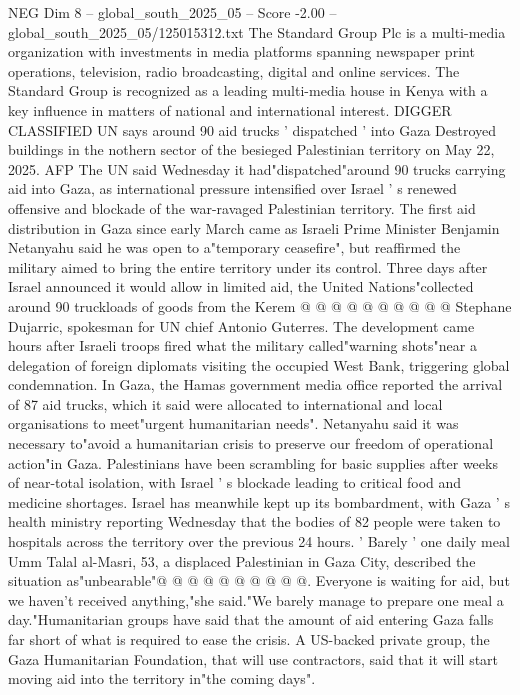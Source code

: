 \begin{textsample}{NEG Dim 8 – global\_south\_2025\_05 – Score -2.00 – global\_south\_2025\_05/125015312.txt}  \label{ex:f8_neg_008}
The Standard Group Plc is a multi-media organization with investments in media platforms spanning newspaper print operations, television, radio broadcasting, digital and online services.
The Standard Group is recognized as a leading multi-media house in Kenya with a key influence in matters of national and international interest.
DIGGER CLASSIFIED UN says around 90 aid trucks ' dispatched ' into Gaza Destroyed buildings in the nothern sector of the besieged Palestinian territory on May 22, 2025.
AFP The UN said Wednesday it had"dispatched"around 90 trucks carrying aid into Gaza, as international pressure intensified over Israel ' s renewed offensive and blockade of the war-ravaged Palestinian territory.
The first aid distribution in Gaza since early March came as Israeli Prime Minister Benjamin Netanyahu said he was open to a"temporary ceasefire", but reaffirmed the military aimed to bring the entire territory under its control.
Three days after Israel announced it would allow in limited aid, the United Nations"collected around 90 truckloads of goods from the Kerem @ @ @ @ @ @ @ @ @ @ Stephane Dujarric, spokesman for UN chief Antonio Guterres.
The development came hours after Israeli troops fired what the military called"warning shots"near a delegation of foreign diplomats visiting the occupied West Bank, triggering global condemnation.
In Gaza, the Hamas government media office reported the arrival of 87 aid trucks, which it said were allocated to international and local organisations to meet"urgent humanitarian needs".
Netanyahu said it was necessary to"avoid a humanitarian crisis to preserve our freedom of operational action"in Gaza.
Palestinians have been scrambling for basic supplies after weeks of near-total isolation, with Israel ' s blockade leading to critical food and medicine shortages.
Israel has meanwhile kept up its bombardment, with Gaza ' s health ministry reporting Wednesday that the bodies of 82 people were taken to hospitals across the territory over the previous 24 hours. ' Barely ' one daily meal Umm Talal al-Masri, 53, a displaced Palestinian in Gaza City, described the situation as"unbearable"@ @ @ @ @ @ @ @ @ @.
Everyone is waiting for aid, but we haven't received anything,"she said."We barely manage to prepare one meal a day."Humanitarian groups have said that the amount of aid entering Gaza falls far short of what is required to ease the crisis.
A US-backed private group, the Gaza Humanitarian Foundation, that will use contractors, said that it will start moving aid into the territory in"the coming days".

\end{textsample}
